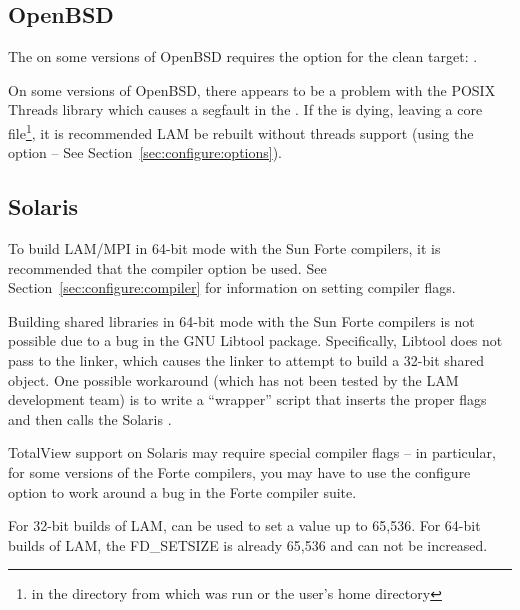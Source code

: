 
\subsection{OpenBSD}

The  on some versions of OpenBSD requires the 
option for the clean target: .

On some versions of OpenBSD, there appears to be a problem with the
POSIX Threads library which causes a segfault in the .  If
the  is dying, leaving a core file\footnote{
in the directory from which  was run or the user's home
directory}, it is recommended LAM be rebuilt without threads support
(using the  option -- See
Section~\ref{sec:configure:options}).


\subsection{Solaris}

To build LAM/MPI in 64-bit mode with the Sun Forte compilers, it is
recommended that the compiler option  be used.  See
Section~\ref{sec:configure:compiler} for information on setting
compiler flags.

Building shared libraries in 64-bit mode with the Sun Forte compilers
is not possible due to a bug in the GNU Libtool package.
Specifically, Libtool does not pass  to the linker,
which causes the linker to attempt to build a 32-bit shared object.
One possible workaround (which has not been tested by the LAM
development team) is to write a ``wrapper''  script that
inserts the proper flags and then calls the Solaris .

TotalView support on Solaris may require special compiler flags -- in
particular, for some versions of the Forte compilers, you may have to
use the configure option 
to work around a bug in the Forte compiler suite.

For 32-bit builds of LAM,  can be used to set a
value up to 65,536.  For 64-bit builds of LAM, the FD\_SETSIZE is
already 65,536 and can not be increased.

